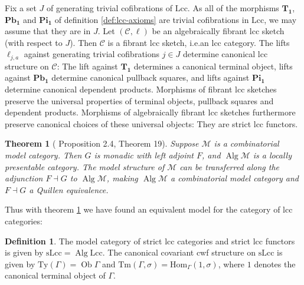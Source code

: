 \documentclass{article}
\newtheorem{theorem}{Theorem}
\theoremstyle{remark}
\theoremstyle{definition}
\newtheorem{definition}{Definition}
\begin{document}
Fix a set $J$ of generating trivial cofibrations of $\mathrm{Lcc}$.
As all of the morphisms $\mathbf{T_1}$, $\mathbf{Pb_1}$ and $\mathbf{Pi_1}$ of definition \ref{def:lcc-axioms} are trivial cofibrations in $\mathrm{Lcc}$, we may assume that they are in $J$.
Let $(\mathcal{C}, \ell)$ be an algebraically fibrant lcc sketch (with respect to $J$).
Then $\mathcal{C}$ is a fibrant lcc sketch, i.e.\@ an lcc category.
The lifts $\ell_{j, a}$ against generating trivial cofibrations $j \in J$ determine canonical lcc structure on $\mathcal{C}$:
The lift against $\mathbf{T_1}$ determines a canonical terminal object, lifts against $\mathbf{Pb_1}$ determine canonical pullback squares, and lifts against $\mathbf{Pi_1}$ determine canonical dependent products.
Morphisms of fibrant lcc sketches preserve the universal properties of terminal objects, pullback squares and dependent products.
Morphisms of algebraically fibrant lcc sketches furthermore preserve canonical choices of these universal objects:
They are strict lcc functors.

\begin{theorem}[\cite{algebraic-models} Proposition 2.4, \cite{equipping-weak-equivalences} Theorem 19]
  \label{th:algebraically-fibrant-model-category}
  Suppose $\mathcal{M}$ is a combinatorial model category.
  Then $G$ is monadic with left adjoint $F$, and $\operatorname{Alg} \mathcal{M}$ is a locally presentable category.
  The model structure of $\mathcal{M}$ can be transferred along the adjunction $F \dashv G$ to $\operatorname{Alg} \mathcal{M}$, making $\operatorname{Alg} \mathcal{M}$ a combinatorial model category and $F \dashv G$ a Quillen equivalence.
\end{theorem}
Thus with theorem \ref{th:algebraically-fibrant-model-category} we have found an equivalent model for the category of lcc categories:
\begin{definition}
  The model category of strict lcc categories and strict lcc functors is given by $\mathrm{sLcc} = \operatorname{Alg} \mathrm{Lcc}$.
  The canonical covariant cwf structure on $\mathrm{sLcc}$ is given by $\mathrm{Ty}(\Gamma) = \operatorname{Ob} \Gamma$ and $\mathrm{Tm}(\Gamma, \sigma) = \mathrm{Hom}_\Gamma(1, \sigma)$, where $1$ denotes the canonical terminal object of $\Gamma$.
\end{definition}
\end{document}
